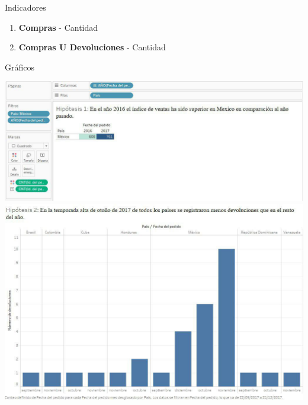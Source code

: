 \documentclass{beamer}
\begin{document}



\begin{frame}{Indicadores}

\begin{enumerate}
	\item \textbf{Compras} - Cantidad
	\item \textbf{Compras U Devoluciones} - Cantidad
	\end{enumerate}
	
\end{frame}
	



\begin{frame}{Gráficos}

\begin{center}
\includegraphics[scale=0.25]{imagenes/Hipotesis1.jpg} 
\includegraphics[scale=0.25]{imagenes/Hipotesis2.jpg} 
\end{center}
	
\end{frame}
\end{document}
